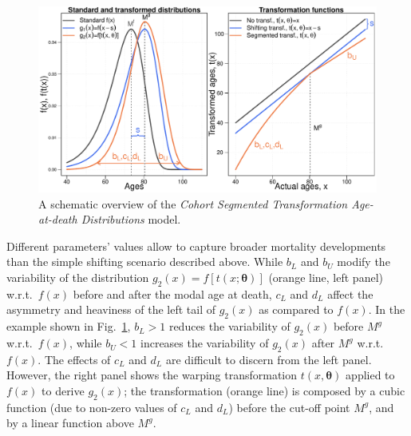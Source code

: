 \documentclass[11pt, a4paper]{article}
\begin{document}
\begin{figure}[t]
	\begin{center}
		\includegraphics[scale=0.57]{./Figures/F1.pdf} 
		\caption{A schematic overview of the \emph{Cohort Segmented Transformation Age-at-death Distributions} model.\label{Fig:CSTADmodel}}    
	\end{center}
\end{figure}

Different parameters' values allow to capture broader mortality developments than the simple shifting scenario described above. While $b_L$ and $b_U$ modify the variability of the distribution $g_2(x)=f\left[t(x;\bm{\theta})\right]$ (orange line, left panel) w.r.t.~$f(x)$ before and after the modal age at death, $c_L$ and $d_L$ affect the asymmetry and heaviness of the left tail of $g_2(x)$ as compared to $f(x)$. In the example shown in Fig.~\ref{Fig:CSTADmodel}, $b_L > 1$ reduces the variability of $g_2(x)$ before $M^g$ w.r.t.~$f(x)$, while $b_U < 1$ increases the variability of $g_2(x)$ after $M^g$ w.r.t.~$f(x)$. The effects of $c_L$ and $d_L$ are difficult to discern from the left panel. However, the right panel shows the warping transformation $t(x,\bm{\theta})$ applied to $f(x)$ to derive $g_2(x)$; the transformation (orange line) is composed by a cubic function (due to non-zero values of $c_L$ and $d_L$) before the cut-off point $M^g$, and by a linear function above $M^g$. \par
\end{document}
